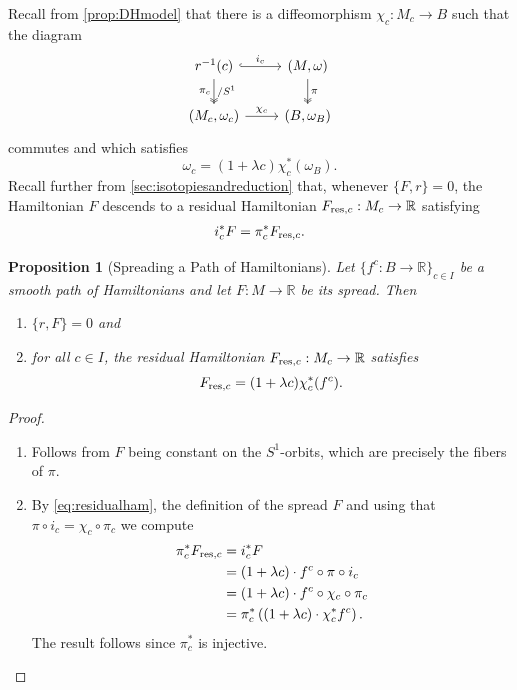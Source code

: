 \documentclass[10pt,oneside,reqno]{amsart}
\newtheorem{proposition}[theorem]{Proposition}
\theoremstyle{definition}
\newcommand{\IR}{\mathbb{R}}
\newcommand{\resc}{{\textup{res},c}}
\begin{document}
Recall from \cref{prop:DHmodel} that there is a diffeomorphism $\chi_c:M_c\to B$ such that the diagram 
\begin{equation*}
        \begin{tikzcd}
            r^{-1}(c) \arrow[r, "i_c", hook] \arrow[d, "/S^1","\pi_c"', two heads] & {(M,\omega)} \arrow[d, "\pi", two heads] \\
            {(M_c,\omega_c)} \arrow[r, "\chi_c"]                              & {(B,\omega_B)}                               
        \end{tikzcd}
    \end{equation*} commutes and which satisfies $$\omega_c = (1+\lambda c)\chi_c^*(\omega_B).$$ Recall further from \cref{sec:isotopiesandreduction} that, whenever $\{F,r\}=0$, the Hamiltonian $F$ descends to a residual Hamiltonian $F_\resc:M_c\to \IR$ satisfying 
    \begin{equation}
        i_c^*F = \pi_c^*F_\resc. \label{eq:residualham}
    \end{equation}
\begin{proposition}[Spreading a Path of Hamiltonians] \label{prop:spreadinghamwithDH}
    Let $\{f^c:B \to \IR\}_{c\in I}$ be a smooth path of Hamiltonians and let $F:M \to \IR$ be its spread. Then
    \begin{enumerate}
        \item $\{r,F\} =0$ and
        \item for all $c\in I$, the residual Hamiltonian $F_\resc:M_c \to \IR$ satisfies
        \begin{equation*}
           F_\resc = (1+\lambda c)\chi_c^*(f^c).
        \end{equation*}
    \end{enumerate}
\end{proposition}
\begin{proof}
    \begin{enumerate}
        \item Follows from $F$ being constant on the $S^1$-orbits, which are precisely the fibers of $\pi.$
        \item  By \eqref{eq:residualham}, the definition of the spread $F$ and using that $\pi \circ i_c = \chi_c \circ \pi_c$ we compute
        \begin{align*}
            \pi_c^* F_\resc &= i_c^*F \\
            &= (1+\lambda c) \cdot f^c\circ \pi\circ i_c \\
            &= (1+\lambda c)\cdot f^c\circ \chi_c \circ \pi_c\\
            &= \pi_c^*\left((1+\lambda c) \cdot\chi_c^*f^c \right).
        \end{align*}
        The result follows since $\pi_c^*$ is injective. \qedhere
    \end{enumerate}
\end{proof}
\end{document}
